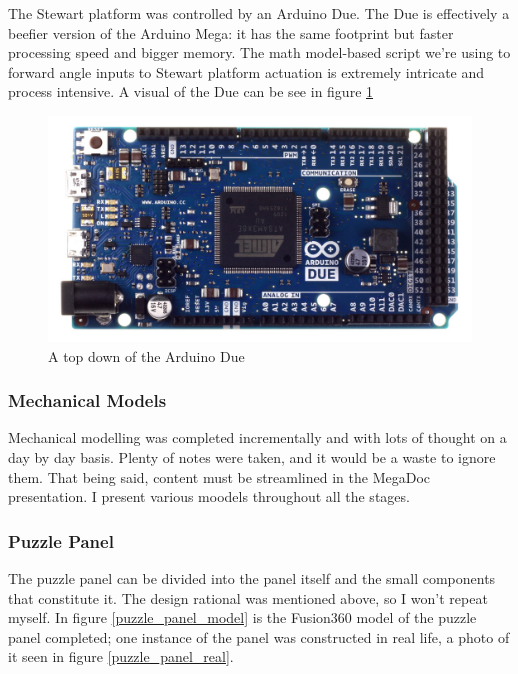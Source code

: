 \documentclass[a4paper, 10pt]{article}
\begin{document}
 		The Stewart platform was controlled by an Arduino Due. The Due is effectively a beefier version of the Arduino Mega: it has the same footprint but faster processing speed and bigger memory. The math model-based script we're using to forward angle inputs to Stewart platform actuation is extremely intricate and process intensive. A visual of the Due can be see in figure \ref{arduino_due}
 		
 		\begin{figure} [!h]
			\centering
			\includegraphics[scale=0.2]{Photos/arduino_due}
			\caption{A top down of the Arduino Due}
			\label{arduino_due}
		\end{figure}
 
 		\subsubsection{Mechanical Models}
 		Mechanical modelling was completed incrementally and with lots of thought on a day by day basis. Plenty of notes were taken, and it would be a waste to ignore them. That being said, content must be streamlined in the MegaDoc presentation. I present various moodels throughout all the stages.
 		
 		\subsubsection*{Puzzle Panel}
		The puzzle panel can be divided into the panel itself and the small components that constitute it. The design rational was mentioned above, so I won't repeat myself. In figure \ref{puzzle_panel_model} is the Fusion360 model of the puzzle panel completed; one instance of the panel was constructed in real life, a photo of it seen in figure \ref{puzzle_panel_real}.
		
\end{document}
